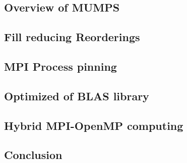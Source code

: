  \subsection{Overview of MUMPS}
  \subsection{Fill reducing Reorderings}
  \subsection{MPI Process pinning}
  \subsection{Optimized of BLAS library}
  \subsection{Hybrid MPI-OpenMP computing}
  \subsection{Conclusion}
